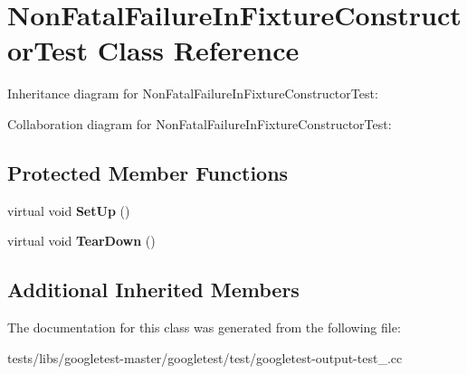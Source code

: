 \hypertarget{classNonFatalFailureInFixtureConstructorTest}{}\section{Non\+Fatal\+Failure\+In\+Fixture\+Constructor\+Test Class Reference}
\label{classNonFatalFailureInFixtureConstructorTest}


Inheritance diagram for Non\+Fatal\+Failure\+In\+Fixture\+Constructor\+Test\+:


Collaboration diagram for Non\+Fatal\+Failure\+In\+Fixture\+Constructor\+Test\+:
\subsection*{Protected Member Functions}
\begin{DoxyCompactItemize}
\item 
\mbox{\label{classNonFatalFailureInFixtureConstructorTest_a7d951f8fbf7b2ac5046be8d8ee7b03d3}} 
virtual void {\bfseries Set\+Up} ()
\item 
\mbox{\label{classNonFatalFailureInFixtureConstructorTest_ab76d79c346d9a378d625fde5739e8ad6}} 
virtual void {\bfseries Tear\+Down} ()
\end{DoxyCompactItemize}
\subsection*{Additional Inherited Members}


The documentation for this class was generated from the following file\+:\begin{DoxyCompactItemize}
\item 
tests/libs/googletest-\/master/googletest/test/googletest-\/output-\/test\+\_\+.\+cc\end{DoxyCompactItemize}
